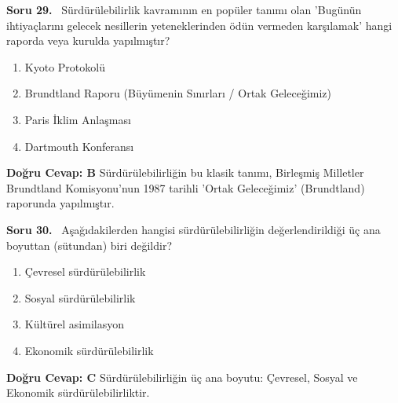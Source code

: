 \documentclass[11pt,a4paper,openany]{book}
\begin{document}
\needspace{5cm}
\vspace{8pt}
\noindent\textbf{\large\sffamily Soru 29.} \ Sürdürülebilirlik kavramının en popüler tanımı olan 'Bugünün ihtiyaçlarını gelecek nesillerin yeteneklerinden ödün vermeden karşılamak' hangi raporda veya kurulda yapılmıştır?
\begin{enumerate}[label=\Alph*), leftmargin=25pt, topsep=4pt, itemsep=2pt]
    \item Kyoto Protokolü
    \item Brundtland Raporu (Büyümenin Sınırları / Ortak Geleceğimiz)
    \item Paris İklim Anlaşması
    \item Dartmouth Konferansı
\end{enumerate}
\vspace{4pt}
\begin{tcolorbox}[title=Cevap ve Açıklama, colback=gray!3!white, colframe=primarycolor!90!black, arc=2mm, fonttitle=\bfseries\sffamily, top=6pt, bottom=6pt]
    \textbf{Doğru Cevap: B}
    \vspace{2pt}
    Sürdürülebilirliğin bu klasik tanımı, Birleşmiş Milletler Brundtland Komisyonu'nun 1987 tarihli 'Ortak Geleceğimiz' (Brundtland) raporunda yapılmıştır.
\end{tcolorbox}
\vspace{10pt}

\needspace{5cm}
\vspace{8pt}
\noindent\textbf{\large\sffamily Soru 30.} \ Aşağıdakilerden hangisi sürdürülebilirliğin değerlendirildiği üç ana boyuttan (sütundan) biri değildir?
\begin{enumerate}[label=\Alph*), leftmargin=25pt, topsep=4pt, itemsep=2pt]
    \item Çevresel sürdürülebilirlik
    \item Sosyal sürdürülebilirlik
    \item Kültürel asimilasyon
    \item Ekonomik sürdürülebilirlik
\end{enumerate}
\vspace{4pt}
\begin{tcolorbox}[title=Cevap ve Açıklama, colback=gray!3!white, colframe=primarycolor!90!black, arc=2mm, fonttitle=\bfseries\sffamily, top=6pt, bottom=6pt]
    \textbf{Doğru Cevap: C}
    \vspace{2pt}
    Sürdürülebilirliğin üç ana boyutu: Çevresel, Sosyal ve Ekonomik sürdürülebilirliktir.
\end{tcolorbox}
\vspace{10pt}
\end{document}
